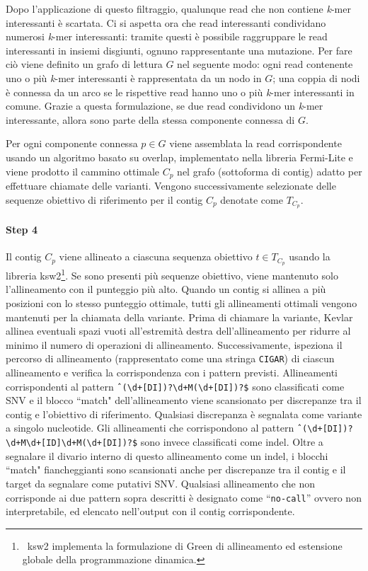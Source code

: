 \documentclass[../main.tex]{subfiles}
\begin{document}
Dopo l'applicazione di questo filtraggio, qualunque read che non contiene \textit{k}-mer interessanti è scartata. Ci si aspetta ora che read interessanti condividano numerosi \textit{k}-mer interessanti: tramite questi è possibile raggruppare le read interessanti in insiemi disgiunti, ognuno rappresentante una mutazione. Per fare ciò viene definito un grafo di lettura $G$ nel seguente modo: ogni read contenente uno o più \textit{k}-mer interessanti è rappresentata da un nodo in $G$; una coppia di nodi è connessa da un arco se le rispettive read hanno uno o più \textit{k}-mer interessanti in comune. Grazie a questa formulazione, se due read condividono un \textit{k}-mer interessante, allora sono parte della stessa componente connessa di $G$. 

Per ogni componente connessa $p\in G$ viene assemblata la read corrispondente usando un algoritmo basato su overlap, implementato nella libreria Fermi-Lite e viene prodotto il cammino ottimale $C_p$ nel grafo (sottoforma di contig) adatto per effettuare chiamate delle varianti. Vengono successivamente selezionate delle sequenze obiettivo di riferimento per il contig $C_p$ denotate come $T_{C_p}$.

\paragraph{Step 4} Il contig $C_p$ viene allineato a ciascuna sequenza obiettivo $t \in T_{C_p}$ usando la libreria ksw2\footnote{\ ksw2 implementa la formulazione di Green di allineamento ed estensione globale della programmazione dinamica.}. 
Se sono presenti più sequenze obiettivo, viene mantenuto solo l'allineamento con il punteggio più alto. Quando un contig si allinea a più posizioni con lo stesso punteggio ottimale, tutti gli allineamenti ottimali vengono mantenuti per la chiamata della variante.
Prima di chiamare la variante, Kevlar allinea eventuali spazi vuoti all'estremità destra dell'allineamento per ridurre al minimo il numero di operazioni di allineamento. Successivamente, ispeziona il percorso di allineamento (rappresentato come una stringa \texttt{CIGAR}) di ciascun allineamento e verifica la corrispondenza con i pattern previsti. Allineamenti corrispondenti al pattern \verb|ˆ(\d+[DI])?\d+M(\d+[DI])?$| sono classificati come SNV e il blocco ``match" dell'allineamento viene scansionato per discrepanze tra il contig e l'obiettivo di riferimento. Qualsiasi discrepanza è segnalata come variante a singolo nucleotide. Gli allineamenti che corrispondono al pattern \verb|ˆ(\d+[DI])?\d+M\d+[ID]\d+M(\d+[DI])?$| sono invece classificati come indel. Oltre a segnalare il divario interno di questo allineamento come un indel, i blocchi ``match" fiancheggianti sono
scansionati anche per discrepanze tra il contig e il target da segnalare come putativi SNV. Qualsiasi allineamento che non corrisponde ai due pattern sopra descritti è designato come ``\texttt{no-call}'' ovvero non interpretabile, ed elencato nell'output con il contig corrispondente. 
\end{document}
